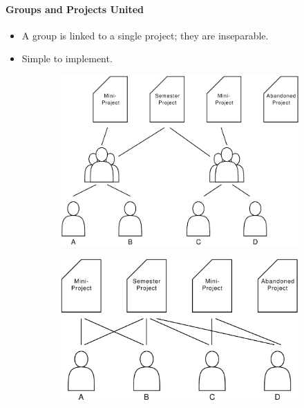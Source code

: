 \paragraph{Groups and Projects United}
\begin{itemize}
	\item A group is linked to a single project; they are inseparable.
	\item Simple to implement.
\end{itemize}

\begin{figure}[p]%
\centering
        \begin{subfigure}[b]{0.8\textwidth}
                \centering
                \includegraphics[width=\textwidth]{images/groupprojectdivision.pdf}
                \label{fig:divProjGroup:div}
        \end{subfigure}%
				\vspace{10mm}
        \begin{subfigure}[b]{0.8\textwidth}
                \centering
                \includegraphics[width=\textwidth]{images/groupprojectunited.pdf}
                \label{fig:divProjGroup:united}
        \end{subfigure}%
%
\label{fig:divProjGroup}%
\end{figure}


